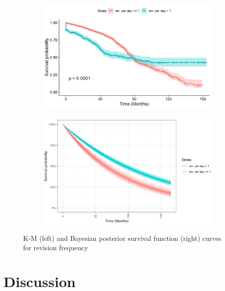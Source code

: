 \documentclass[acmconf]{acmart}
\begin{document}
\begin{figure}[!ht]
    \centering
    \begin{subfigure}[b]{0.45\columnwidth}
        \centering
        \includegraphics[width=\textwidth]{img/KM-rev_freq.jpg}   
        \label{fig:KM_curve_for_revision_frequency}
    \end{subfigure}
    \hfill
    \begin{subfigure}[b]{0.45\columnwidth}
        \centering 
        \includegraphics[width=\textwidth]{img/commit_freq_bayes.png}
        \label{fig:Bayesian_curve_for_revision_frequency}
    \end{subfigure}
    \caption{\small K-M (left) and Bayesian posterior survival function (right) curves for revision frequency} 
    \label{fig:Revision frequency}
\end{figure}

\section{Discussion} \label{discussion}
\end{document}
